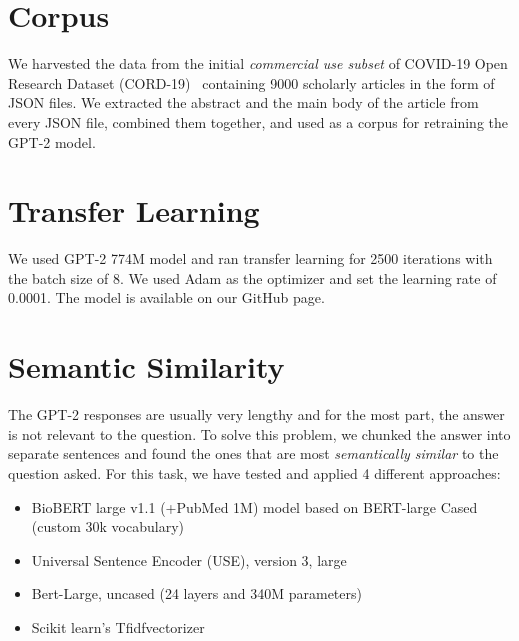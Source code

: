 \documentclass[sigconf,natbib=false]{acmart}
\begin{document}

\section{Corpus}

We harvested the data from the initial \textit{commercial use subset} of
COVID-19 Open Research Dataset (CORD-19)~\cite{cord19} containing 9000
scholarly articles in the form of JSON files. We extracted the abstract and the
main body of the article from every JSON file, combined them together, and used
as a corpus for retraining the GPT-2 model.


\section{Transfer Learning}

We used GPT-2 774M model and ran transfer learning for 2500 iterations with the
batch size of 8. We used Adam as the optimizer and set the learning rate of
0.0001. The model is available on our GitHub page.


\section{Semantic Similarity}

The GPT-2 responses are usually very lengthy and for the most part, the answer
is not relevant to the question. To solve this problem, we chunked the answer
into separate sentences and found the ones that are most \textit{semantically
  similar} to the question asked. For this task, we have tested and applied 4
different approaches:

\begin{itemize}
  \item BioBERT large v1.1 (+PubMed 1M) model based on BERT-large Cased (custom 30k vocabulary)
  \item Universal Sentence Encoder (USE), version 3, large
  \item Bert-Large, uncased (24 layers and 340M parameters)
  \item Scikit learn's Tfidfvectorizer
\end{itemize}
\end{document}
